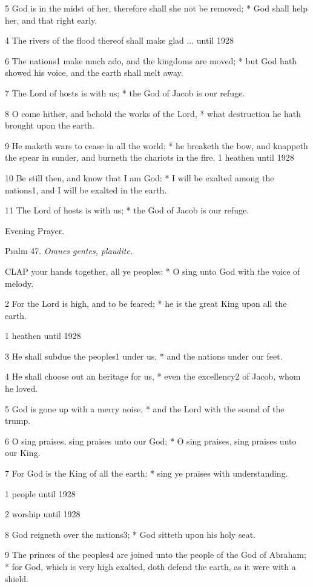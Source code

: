 5 God is in the midst of her, therefore shall she not
be removed; * God shall help her, and that right early.

4 The rivers of the
flood thereof shall make glad ...
until 1928

6 The nations1 make much ado, and the kingdoms
are moved; * but God hath showed his voice, and the earth shall melt away.

7 The Lord of hosts is with us; * the God of Jacob is
our refuge.

8 O come hither, and behold the works of the Lord, *
what destruction he hath brought upon the earth.

9 He maketh wars to cease in all the world; * he breaketh
the bow, and knappeth the spear in sunder, and burneth the chariots in the
fire. 1 heathen
until 1928

10 Be still then, and know that I am God: * I will
be exalted among the nations1, and I will be exalted in the
earth.

11 The Lord of hosts is with us; * the God of Jacob
is our refuge.

Evening
Prayer.

Psalm
47. \emph{Omnes gentes, plaudite.}

CLAP
your hands together, all ye peoples: * O sing unto God with the voice
of melody.

2 For the Lord is high, and to be feared; * he is the
great King upon all the earth.

1 heathen
until 1928

3 He shall subdue the peoples1 under us, * and the nations under
our feet.

4 He shall choose out an heritage for us, * even the
excellency2 of Jacob, whom he loved.

5 God is gone up with a merry noise, * and the Lord with
the sound of the trump.

6 O sing praises, sing praises unto our God; * O sing
praises, sing praises unto our King.

7 For God is the King of all the earth: * sing ye praises
with understanding.

1 people
until 1928

2 worship
until 1928

8 God reigneth over the nations3; * God
sitteth upon his holy seat.

9 The princes of the peoples4 are joined
unto the people of the God of Abraham; * for God, which is very high exalted,
doth defend the earth, as it were with a shield.

